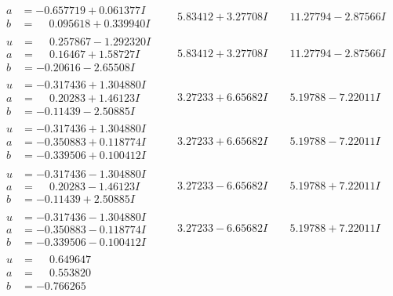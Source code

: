 \documentclass[1p]{elsarticle_modified}
\theoremstyle{definition}
\begin{document}
$$\begin{array}{c|c|c}
\begin{aligned}
a &= -0.657719 + 0.061377 I \\
b &= \phantom{-}0.095618 + 0.339940 I\end{aligned}
 & \phantom{-}5.83412 + 3.27708 I & \phantom{-}11.27794 - 2.87566 I \\ \hline\begin{aligned}
u &= \phantom{-}0.257867 - 1.292320 I \\
a &= \phantom{-}0.16467 + 1.58727 I \\
b &= -0.20616 - 2.65508 I\end{aligned}
 & \phantom{-}5.83412 + 3.27708 I & \phantom{-}11.27794 - 2.87566 I \\ \hline\begin{aligned}
u &= -0.317436 + 1.304880 I \\
a &= \phantom{-}0.20283 + 1.46123 I \\
b &= -0.11439 - 2.50885 I\end{aligned}
 & \phantom{-}3.27233 + 6.65682 I & \phantom{-}5.19788 - 7.22011 I \\ \hline\begin{aligned}
u &= -0.317436 + 1.304880 I \\
a &= -0.350883 + 0.118774 I \\
b &= -0.339506 + 0.100412 I\end{aligned}
 & \phantom{-}3.27233 + 6.65682 I & \phantom{-}5.19788 - 7.22011 I \\ \hline\begin{aligned}
u &= -0.317436 - 1.304880 I \\
a &= \phantom{-}0.20283 - 1.46123 I \\
b &= -0.11439 + 2.50885 I\end{aligned}
 & \phantom{-}3.27233 - 6.65682 I & \phantom{-}5.19788 + 7.22011 I \\ \hline\begin{aligned}
u &= -0.317436 - 1.304880 I \\
a &= -0.350883 - 0.118774 I \\
b &= -0.339506 - 0.100412 I\end{aligned}
 & \phantom{-}3.27233 - 6.65682 I & \phantom{-}5.19788 + 7.22011 I \\ \hline\begin{aligned}
u &= \phantom{-}0.649647\phantom{ +0.000000I} \\
a &= \phantom{-}0.553820\phantom{ +0.000000I} \\
b &= -0.766265\phantom{ +0.000000I}\end{aligned}

\end{array}$$
\end{document}
